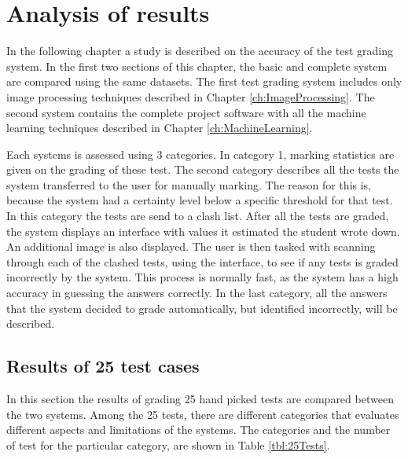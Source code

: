 \chapter{Analysis of results}
\label{ch:Results}
\ifpdf
\graphicspath{{Chapter5/Chapter5Figures/}}
\fi

In the following chapter a study is described on the accuracy of the test grading system. In the first two sections of this chapter, the basic and complete system are compared using the same datasets. The first test grading system includes only image processing techniques described in Chapter \ref{ch:ImageProcessing}. The second system contains the complete project software with all the machine learning techniques described in Chapter \ref{ch:MachineLearning}.

Each systems is assessed using 3 categories. In category 1, marking statistics are given on the grading of these test. The second category describes all the tests the system transferred to the user for manually marking. The reason for this is, because the system had a certainty level below a specific threshold for that test. In this category the tests are send to a clash list. After all the tests are graded, the system displays an interface with values it estimated the student wrote down. An additional image is also displayed. The user is then tasked with scanning through each of the clashed tests, using the interface, to see if any tests is graded incorrectly by the system. This process is normally fast, as the system has a high accuracy in guessing the answers correctly. In the last category, all the answers that the system decided to grade automatically, but identified incorrectly, will be described.

\section{Results of 25 test cases}

In this section the results of grading 25 hand picked tests are compared between the two systems. Among the 25 tests, there are different categories that evaluates different aspects and limitations of the systems. The categories and the number of test for the particular category, are shown in Table \ref{tbl:25Tests}.

